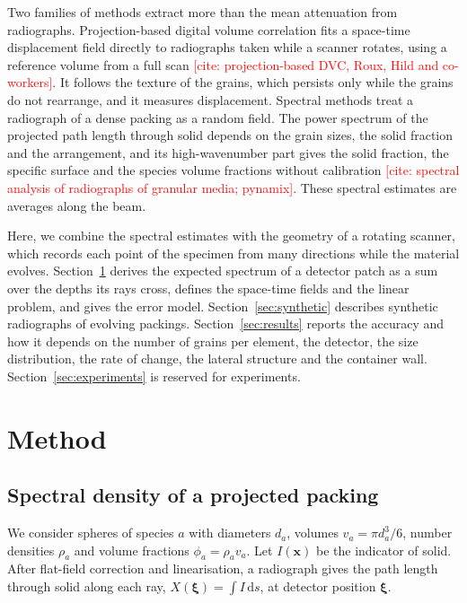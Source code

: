\documentclass[11pt]{article}
\newcommand{\todo}[1]{\textcolor{red}{[#1]}}
\newcommand{\dd}{\mathrm{d}}
\newcommand{\x}{\bm{x}}
\begin{document}
Two families of methods extract more than the mean attenuation from
radiographs. Projection-based digital volume correlation fits a space-time
displacement field directly to radiographs taken while a scanner rotates,
using a reference volume from a full scan \todo{cite: projection-based DVC,
Roux, Hild and co-workers}. It follows the texture of the grains, which
persists only while the grains do not rearrange, and it measures
displacement. Spectral methods treat a radiograph of a dense packing as a
random field. The power spectrum of the projected path length through solid
depends on the grain sizes, the solid fraction and the arrangement, and its
high-wavenumber part gives the solid fraction, the specific surface and the
species volume fractions without calibration \todo{cite: spectral analysis
of radiographs of granular media; pynamix}. These spectral estimates are
averages along the beam.

Here, we combine the spectral estimates with the geometry of a rotating
scanner, which records each point of the specimen from many directions while
the material evolves. Section~\ref{sec:method} derives the expected spectrum
of a detector patch as a sum over the depths its rays cross, defines the
space-time fields and the linear problem, and gives the error model.
Section~\ref{sec:synthetic} describes synthetic radiographs of evolving
packings. Section~\ref{sec:results} reports the accuracy and how it depends
on the number of grains per element, the detector, the size distribution,
the rate of change, the lateral structure and the container wall.
Section~\ref{sec:experiments} is reserved for experiments.

\section{Method}\label{sec:method}

\subsection{Spectral density of a projected packing}

We consider spheres of species $a$ with diameters $d_a$, volumes
$v_a=\pi d_a^3/6$, number densities $\rho_a$ and volume fractions
$\phi_a=\rho_a v_a$. Let $I(\x)$ be the indicator of solid. After flat-field
correction and linearisation, a radiograph gives the path length through
solid along each ray, $X(\bm\xi)=\int I\,\dd s$, at detector position
$\bm\xi$.
\end{document}
